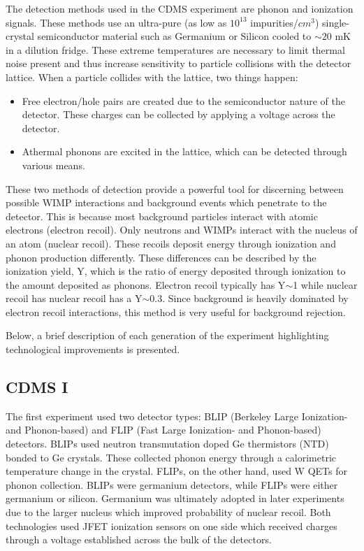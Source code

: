 \documentclass{report}
\begin{document}
The detection methods used in the CDMS experiment are phonon and ionization signals. These methods use an ultra-pure (as low as $10^{13}$ impurities/$cm^3$) single-crystal semiconductor material such as Germanium or Silicon cooled to $\sim 20$ mK in a dilution fridge. These extreme temperatures are necessary to limit thermal noise present and thus increase sensitivity to particle collisions with the detector lattice. When a particle collides with the lattice, two things happen:
\begin{itemize}
\item Free electron/hole pairs are created due to the semiconductor nature of the detector. These charges can be collected by applying a voltage across the detector.
\item Athermal phonons are excited in the lattice, which can be detected through various means.
\end{itemize}

These two methods of detection provide a powerful tool for discerning between possible WIMP interactions and background events which penetrate to the detector. This is because most background particles interact with atomic electrons (electron recoil). Only neutrons and WIMPs interact with the nucleus of an atom (nuclear recoil). These recoils deposit energy through ionization and phonon production differently. These differences can be described by the ionization yield, Y, which is the ratio of energy deposited through ionization to the amount deposited as phonons. Electron recoil typically has Y$\sim$1 while nuclear recoil has nuclear recoil has a Y$\sim$0.3. Since background is heavily dominated by electron recoil interactions, this method is very useful for background rejection.

Below, a brief description of each generation of the experiment highlighting technological improvements is presented.

\subsection{CDMS I}
The first experiment used two detector types: BLIP (Berkeley Large Ionization- and Phonon-based) and FLIP (Fast Large Ionization- and Phonon-based) detectors. BLIPs used neutron transmutation doped Ge thermistors (NTD) bonded to Ge crystals. These collected phonon energy through a calorimetric temperature change in the crystal. FLIPs, on the other hand, used W QETs for phonon collection. BLIPs were germanium detectors, while FLIPs were either germanium or silicon. Germanium was ultimately adopted in later experiments due to the larger nucleus which improved probability of nuclear recoil. Both technologies used JFET ionization sensors on one side which received charges through a voltage established across the bulk of the detectors.
\end{document}
